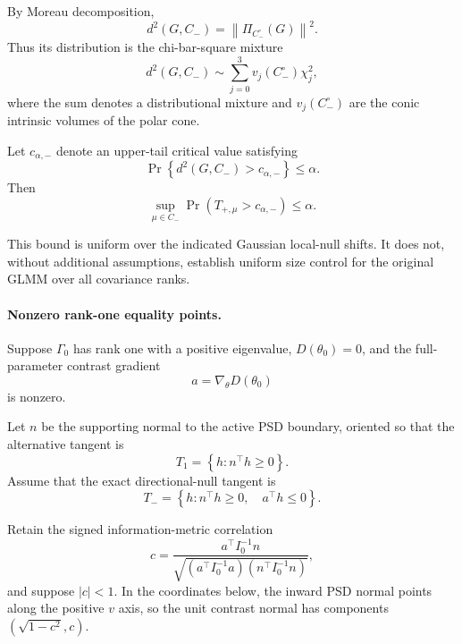 By Moreau decomposition,
\begin{equation*}
d^2(G,C_-)
=
\left\|
\Pi_{C_-^\circ}(G)
\right\|^2.
\end{equation*}
Thus its distribution is the chi-bar-square mixture
\begin{equation}
d^2(G,C_-)
\sim
\sum_{j=0}^{3}
v_j(C_-^\circ)\chi_j^2,
\label{eq:directional-distance-mixture}
\end{equation}
where the sum denotes a distributional mixture and
$v_j(C_-^\circ)$ are the conic intrinsic volumes of the
polar cone.

Let $c_{\alpha,-}$ denote an upper-tail critical value
satisfying
\begin{equation*}
\Pr
\left\{
d^2(G,C_-)>c_{\alpha,-}
\right\}
\leq
\alpha.
\end{equation*}
Then
\begin{equation}
\sup_{\mu\in C_-}
\Pr
\left(
T_{+,\mu}>c_{\alpha,-}
\right)
\leq
\alpha.
\label{eq:directional-gaussian-calibration}
\end{equation}

This bound is uniform over the indicated Gaussian
local-null shifts. It does not, without additional
assumptions, establish uniform size control for the
original GLMM over all covariance ranks.

\paragraph{Nonzero rank-one equality points.}

Suppose $\Gamma_0$ has rank one with a positive
eigenvalue, $D(\theta_0)=0$, and the full-parameter
contrast gradient
\begin{equation*}
a
=
\nabla_\theta D(\theta_0)
\end{equation*}
is nonzero.

Let $n$ be the supporting normal to the active PSD
boundary, oriented so that the alternative tangent is
\begin{equation*}
T_1
=
\left\{
h:
n^\top h\geq 0
\right\}.
\end{equation*}
Assume that the exact directional-null tangent is
\begin{equation*}
T_-
=
\left\{
h:
n^\top h\geq 0,
\quad
a^\top h\leq 0
\right\}.
\end{equation*}

Retain the signed information-metric correlation
\begin{equation}
c
=
\frac{
a^\top I_0^{-1}n
}{
\sqrt{
(a^\top I_0^{-1}a)
(n^\top I_0^{-1}n)
}
},
\label{eq:directional-normal-correlation}
\end{equation}
and suppose $|c|<1$. In the coordinates below, the
inward PSD normal points along the positive $v$ axis, so the
unit contrast normal has components $(\sqrt{1-c^2},c)$.

